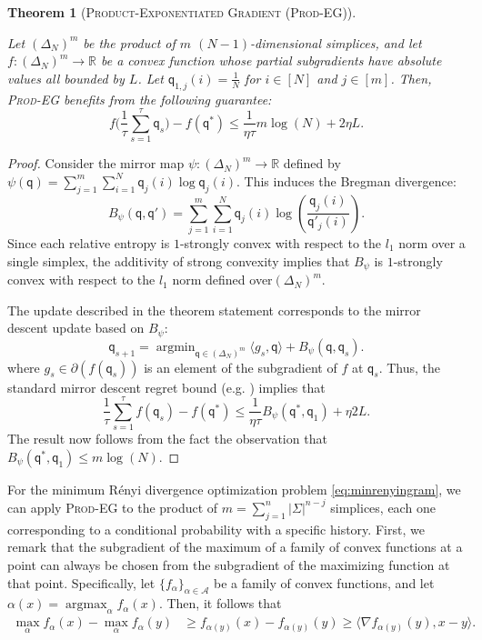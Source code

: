 \documentclass{article}
\DeclareMathOperator*{\argmax}{argmax}
\DeclareMathOperator*{\argmin}{argmin}
\newcommand{\Rset}{\mathbb{R}}
\newcommand{\sfq}{{\mathsf q}}
\newcommand{\cA}{\mathcal A}
\newtheorem{theorem}{Theorem}
\begin{document}
\begin{theorem}[\textsc{Product-Exponentiated Gradient (Prod-EG)}]
  \label{th:prodeg}
  \text{ } 

  Let $(\Delta_N)^m$ be the product of $m$ $(N-1)$-dimensional simplices, and let\\
  $f\colon (\Delta_N)^m \to \Rset$ be a convex function whose partial
  subgradients have absolute values all bounded by $L$. Let
  $\sfq_{1,j}(i) = \frac{1}{N}$ for $i \in [N]$ and $j \in [m]$.  Then,
  \textsc{Prod-EG} benefits from the following guarantee:
\begin{equation*}
f\bigg(\frac{1}{\tau} \sum_{s = 1}^\tau \sfq_s\bigg) - f(\sfq^*) \leq
\frac{1}{\eta \tau } m \log(N) + 2 \eta L.
\end{equation*}
\end{theorem}
\begin{proof}
  Consider the mirror map $\psi\colon (\Delta_N)^m \to \Rset$ defined by $\psi(\sfq) = \sum_{j=1}^m \sum_{i=1}^N \sfq_{j}(i) \log \sfq_j(i) $.
  This induces the Bregman divergence:
\begin{equation*} 
B_\psi(\sfq, \sfq') = \sum_{j=1}^m \sum_{i=1}^N \sfq_j(i) \log
\left(\frac{ \sfq_j(i)}{ \sfq'_j(i)} \right).
\end{equation*}
Since each relative entropy is $1$-strongly convex with respect to the
$l_1$ norm over a single simplex, the additivity of strong convexity
implies that $B_\psi$ is $1$-strongly convex with respect to the $l_1$
norm defined over$(\Delta_N)^m$.

The update described in the theorem statement corresponds to the
mirror descent update based on $B_\psi$:
\begin{equation*}
\sfq_{s+1} = \argmin_{\sfq \in (\Delta_N)^m} \langle g_s , \sfq
\rangle + B_\psi(\sfq, \sfq_s).
\end{equation*}
where $g_s \in \partial(f(\sfq_s))$ is an element of the subgradient
of $f$ at $\sfq_s$.  Thus, the standard mirror descent regret bound
(e.g. \citep{Bubeck2015}) implies that
\begin{equation*}
\frac{1}{\tau} \sum_{s = 1}^\tau f(\sfq_s) - f(\sfq^*) \leq \frac{1}{\eta \tau } B_\psi(\sfq^*, \sfq_1) + \eta 2 L.
\end{equation*}
The result now follows from the fact the observation that 
$B_\psi(\sfq^*, \sfq_1) \leq m \log(N)$.
\end{proof}

For the minimum R\'{e}nyi divergence optimization problem
\eqref{eq:minrenyingram}, we can apply \textsc{Prod-EG} to
the product of $m = \sum_{j=1}^n |\Sigma|^{n-j}$ simplices, each one
corresponding to a conditional probability with a specific history.
First, we remark that the subgradient of the maximum of a family of
convex functions at a point can always be chosen from the subgradient
of the maximizing function at that point.  Specifically, let
$\{f_\alpha\}_{\alpha \in \cA}$ be a family of convex functions, and
let $\alpha(x) = \argmax_{\alpha} f_\alpha(x)$. Then, it follows that
\begin{align*}
  \max_\alpha f_\alpha(x) - \max_\alpha f_\alpha(y)
  &\geq f_{\alpha(y)}(x) - f_{\alpha(y)}(y) 
  \geq \langle \nabla f_{\alpha(y)}(y), x - y \rangle .
\end{align*}
\end{document}
